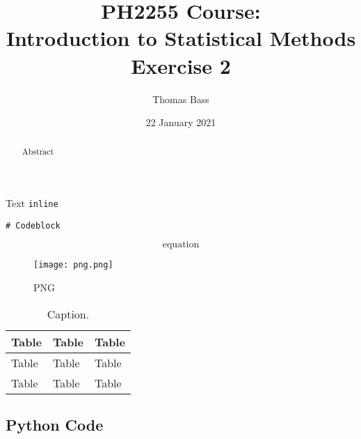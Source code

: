 \documentclass[a4paper]{article}
\title{PH2255 Course:\\
Introduction to Statistical Methods\\Exercise 2}
\author{Thomas Bass}
\date{22 January 2021}
\begin{document}
\maketitle

\begin{abstract}
Abstract
\end{abstract}

Text \lstinline$inline$
\begin{lstlisting}
# Codeblock
\end{lstlisting}
\begin{equation}
\text{equation}
\end{equation}

\begin{figure}[h]
\centerline{\texttt{[image: png.png]}}
\caption{PNG}
\label{fig:png}
\end{figure}

\begin{table}[h!]
\centering
\begin{tabular}{lll}
\hline
Table & Table & Table\\ \hline
Table & Table & Table \\
Table & Table & Table \\
\end{tabular}
\caption{\label{tab:table}Caption.}
\end{table}
\newpage

\begin{appendix}
\section{Python Code}\label{sec:python}

\end{appendix}
\end{document}
